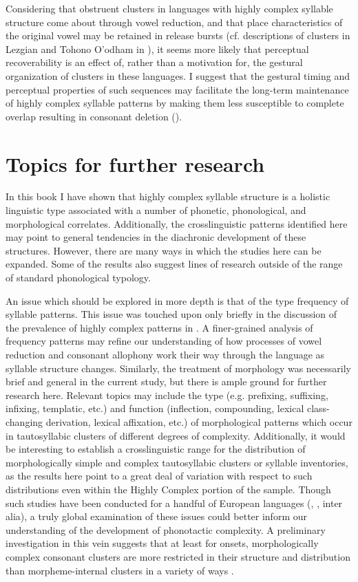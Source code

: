   Considering that obstruent clusters in languages with highly complex syllable structure come about through vowel reduction, and that place characteristics of the original vowel may be retained in release bursts (cf. descriptions of clusters in Lezgian and Tohono O’odham in ), it seems more likely that perceptual recoverability is an effect of, rather than a motivation for, the gestural organization of clusters in these languages. I suggest that the gestural timing and perceptual properties of such sequences may facilitate the long-term maintenance of highly complex syllable patterns by making them less susceptible to complete overlap resulting in consonant deletion (\citealt{BrowmanGoldstein1990}).

\section{Topics for further research}\label{sec:8.6}

  In this book I have shown that highly complex syllable structure is a holistic linguistic type associated with a number of phonetic, phonological, and morphological correlates. Additionally, the crosslinguistic patterns identified here may point to general tendencies in the diachronic development of these structures. However, there are many ways in which the studies here can be expanded. Some of the results also suggest lines of research outside of the range of standard phonological typology.

  An issue which should be explored in more depth is that of the type frequency of syllable patterns. This issue was touched upon only briefly in the discussion of the prevalence of highly complex patterns in . A finer-grained analysis of frequency patterns may refine our understanding of how processes of vowel reduction and consonant allophony work their way through the language as syllable structure changes. Similarly, the treatment of morphology was necessarily brief and general in the current study, but there is ample ground for further research here. Relevant topics may include the type (e.g. prefixing, suffixing, infixing, templatic, etc.) and function (inflection, compounding, lexical class-changing derivation, lexical affixation, etc.) of morphological patterns which occur in tautosyllabic clusters of different degrees of complexity. Additionally, it would be interesting to establish a crosslinguistic range for the distribution of morphologically simple and complex tautosyllabic clusters or syllable inventories, as the results here point to a great deal of variation with respect to such distributions even within the Highly Complex portion of the sample. Though such studies have been conducted for a handful of European languages (\citealt{DresslerDziubalska-Kołaczyk2006}, \citealt{DresslerEtAl2010}, inter alia), a truly global examination of these issues could better inform our understanding of the development of phonotactic complexity. A preliminary investigation in this vein suggests that at least for onsets, morphologically complex consonant clusters are more restricted in their structure and distribution than morpheme-internal clusters in a variety of ways \citep{Easterday2019}.


